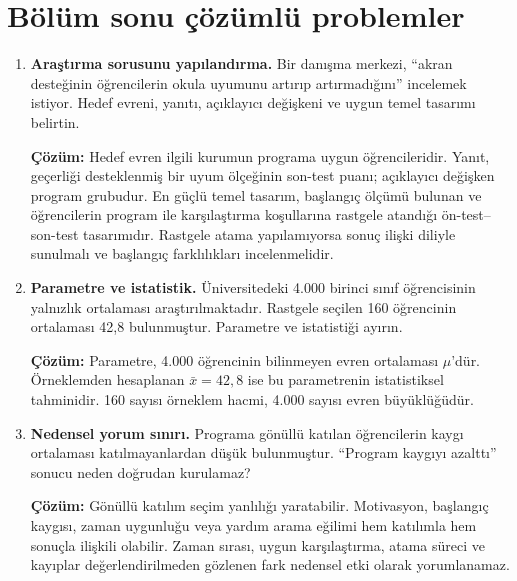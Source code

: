 \section{Bölüm sonu çözümlü problemler}

\begin{enumerate}
  \item \textbf{Araştırma sorusunu yapılandırma.} Bir danışma merkezi, ``akran desteğinin öğrencilerin okula uyumunu artırıp artırmadığını'' incelemek istiyor. Hedef evreni, yanıtı, açıklayıcı değişkeni ve uygun temel tasarımı belirtin.

  \textbf{Çözüm:} Hedef evren ilgili kurumun programa uygun öğrencileridir. Yanıt, geçerliği desteklenmiş bir uyum ölçeğinin son-test puanı; açıklayıcı değişken program grubudur. En güçlü temel tasarım, başlangıç ölçümü bulunan ve öğrencilerin program ile karşılaştırma koşullarına rastgele atandığı ön-test--son-test tasarımıdır. Rastgele atama yapılamıyorsa sonuç ilişki diliyle sunulmalı ve başlangıç farklılıkları incelenmelidir.

  \item \textbf{Parametre ve istatistik.} Üniversitedeki 4.000 birinci sınıf öğrencisinin yalnızlık ortalaması araştırılmaktadır. Rastgele seçilen 160 öğrencinin ortalaması 42,8 bulunmuştur. Parametre ve istatistiği ayırın.

  \textbf{Çözüm:} Parametre, 4.000 öğrencinin bilinmeyen evren ortalaması $\mu$'dür. Örneklemden hesaplanan $\bar{x}=42{,}8$ ise bu parametrenin istatistiksel tahminidir. 160 sayısı örneklem hacmi, 4.000 sayısı evren büyüklüğüdür.

  \item \textbf{Nedensel yorum sınırı.} Programa gönüllü katılan öğrencilerin kaygı ortalaması katılmayanlardan düşük bulunmuştur. ``Program kaygıyı azalttı'' sonucu neden doğrudan kurulamaz?

  \textbf{Çözüm:} Gönüllü katılım seçim yanlılığı yaratabilir. Motivasyon, başlangıç kaygısı, zaman uygunluğu veya yardım arama eğilimi hem katılımla hem sonuçla ilişkili olabilir. Zaman sırası, uygun karşılaştırma, atama süreci ve kayıplar değerlendirilmeden gözlenen fark nedensel etki olarak yorumlanamaz.
\end{enumerate}